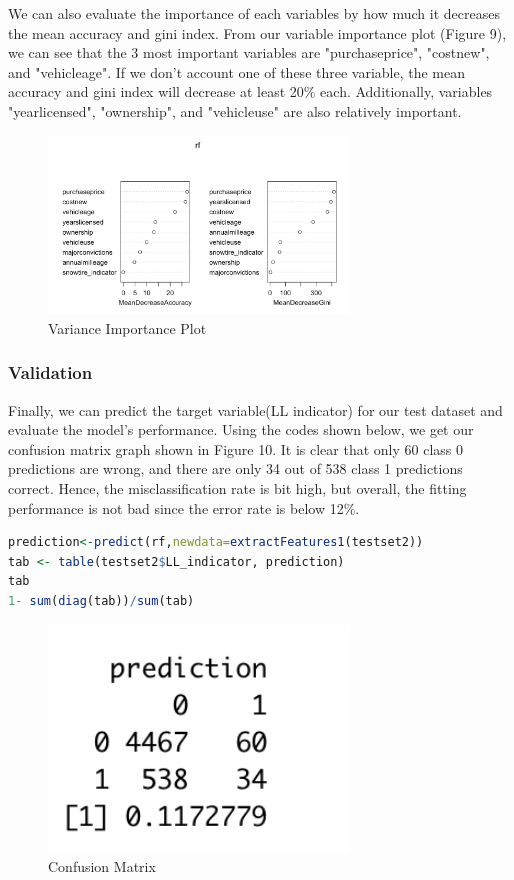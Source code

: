 \documentclass[12pt]{article} %
\theoremstyle{definition}
\begin{document}
We can also evaluate the importance of each variables by how much it decreases the mean accuracy and gini index. From our variable importance plot (Figure 9), we can see that the 3 most important variables are  "purchaseprice", "costnew", and "vehicleage". If we don't account one of these three variable, the mean accuracy and gini index will decrease at least 20\% each. Additionally, variables "yearlicensed", "ownership", and "vehicleuse" are also relatively important.

\begin{figure}[H]
    \centering
    \includegraphics[width=8cm]{p4.png}
    \caption{Variance Importance Plot}
    \label{fig:subim2}
\end{figure}

\subsubsection{Validation}
Finally, we can predict the target variable(LL indicator) for our test dataset and evaluate the model's performance. Using the codes shown below, we get our confusion matrix graph\cite{confusionmatrix} shown in Figure 10. It is clear that only 60 class 0 predictions are wrong, and there are only 34 out of 538 class 1 predictions correct. Hence, the misclassification rate is bit high, but overall, the fitting performance is not bad since the error rate is below 12\%. 


\begin{lstlisting}[language=R,xleftmargin=.1\textwidth]
prediction<-predict(rf,newdata=extractFeatures1(testset2))
tab <- table(testset2$LL_indicator, prediction)
tab
1- sum(diag(tab))/sum(tab)
\end{lstlisting}

\begin{figure}[H]
    \centering
    \includegraphics[width=8cm]{prediction.png}
    \caption{Confusion Matrix}
    \label{fig:my_label}
\end{figure}
\end{document}
